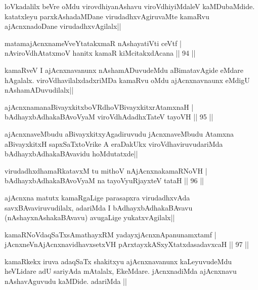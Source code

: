 \begin{artha}
loVkadalilx beVre oMdu virovdhiyanAshavu viroVdhiyiMdaleV kaMDubaMdide. katatxleyu parxkAshadaMDane virudadhxvAgiruvaMte kamaRvu ajAcnxnadoDane virudadhxvAgilalx||
\end{artha}

\begin{shl}
matamajAcnxnameVveYtatakxmaR nAshayatiVti ceVtf |\\
nAviroVdhAtatxmoV hanitx kamaR kiMcitakxdAcana \hfill || 94 ||
\end{shl}

\begin{artha}
kamaRveV I ajAcnxnavanunx nAshamADuvudeMdu aBimatavAgide eMdare hAgalalx. viroVdhavilalxdadxriMDa kamaRvu oMdu ajAcnxnavnaunx eMdigU nAshamADuvudilalx||
\end{artha}

\begin{shl}
ajAcnxnamanaBivayxkitxboVRdhoV\s BivayxkitxrAtamxnaH |\\
bAdhayxbAdhakaBAvoV\s yaM viroVdhAdadhxTateV tayoVH \hfill || 95 ||
\end{shl}

\begin{artha}
ajAcnxnaveMbudu aBivayxkitxyAgadiruvudu jAcnxnaveMbudu Atamxna aBivayxkitxH sapxSaTxtoVrike A eraDakUkx viroVdhaviruvudariMda bAdhayxbAdhakaBAvavidu hoMdutatxde||
\end{artha}

\begin{shl}
virudadhxdhamaRkatavxM tu mithoV nAjAcnxnakamaRNoVH |\\
bAdhayxbAdhakaBAvoV\s yaM na tayoVyuRjayxteV tataH \hfill || 96 ||
\end{shl}

\begin{artha}
ajAcnxna matutx kamaRgaLige parasapxra virudadhxvAda savxBAvaviruvudilalx, adariMda I bAdhayxbAdhakaBAvavu (nAshayxnAshakaBAvavu) avugaLige yukatxvAgilalx||
\end{artha}

\begin{shl}
kamaRNoV\s daqSaTxsAmathayxRM yadayxjAcnxnApanunamxtamf |\\
jAcnxneVnAjAcnxnavidhavxsetxVH pArxtayxkASxyXtatxdasadavxcaH \hfill || 97 ||
\end{shl}

\begin{artha}
kamaRkekx iruva adaqSaTx shakitxyu ajAcnxnavanunx kaLeyuvudeMdu heVLidare adU sariyAda mAtalalx, EkeMdare. jAcnxnadiMda ajAcnxnavu nAshavAguvudu kaMDide. adariMda ||
\end{artha}

